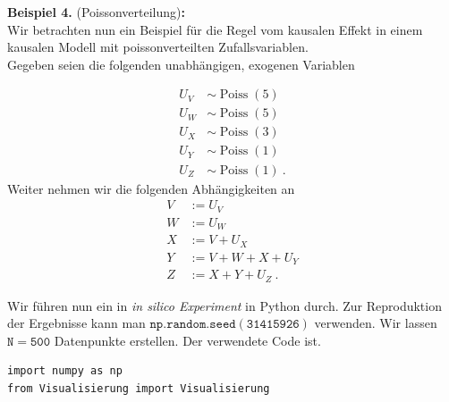 \documentclass[headsepline,11pt,bibliography=leveldown]{scrbook}
\newcounter{NewZaehler}
\newcommand{\NewZahl}{\refstepcounter{NewZaehler}4.\theNewZaehler}
\newenvironment{NewBeispiel}[1]{\par\medskip\textbf{Beispiel \NewZahl} #1\textbf{:}\\}{\par\medskip}
\newcommand{\Poiss}{\operatorname{Poiss}}
\begin{document}
\begin{NewBeispiel}{(Poissonverteilung)}
Wir betrachten nun ein Beispiel für die Regel vom kausalen Effekt in einem kausalen Modell mit poissonverteilten Zufallsvariablen.\\

Gegeben seien die folgenden unabhängigen, exogenen Variablen\\
\begin{minipage}{0.5\linewidth}
\begin{align*}
U_V &\sim \Poiss(5)\\
U_W &\sim \Poiss(5)\\
U_X &\sim \Poiss(3)\\ 
U_Y &\sim \Poiss(1)\\
U_Z &\sim \Poiss(1)~.
\end{align*}
Weiter nehmen wir die folgenden Abhängigkeiten an
\begin{align*}
V &:= U_V\\
W &:= U_W\\
X &:= V + U_X\\
Y &:= V + W + X + U_Y\\
Z &:= X + Y + U_Z~.
\end{align*}
\vspace*{0\baselineskip}
\end{minipage}
\begin{minipage}{0.5\linewidth}
\begin{center}
\end{center}
\end{minipage}

Wir führen nun ein in \textit{in silico Experiment} in Python durch. Zur Reproduktion der Ergebnisse kann man $\mathtt{np.random.seed(31415926)}$ verwenden. Wir lassen $\mathtt{N = 500}$ Datenpunkte erstellen. Der verwendete Code ist.
\begin{lstlisting}
import numpy as np
from Visualisierung import Visualisierung


\end{lstlisting}
\end{NewBeispiel}
\end{document}
